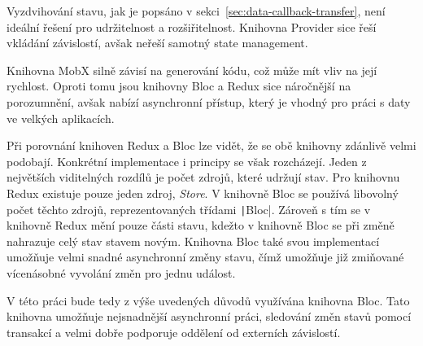 Vyzdvihování stavu,
jak je popsáno v sekci~\ref{sec:data-callback-transfer},
není ideální řešení pro udržitelnost a rozšiřitelnost.
Knihovna Provider sice řeší vkládání závislostí,
avšak neřeší samotný state management.

Knihovna MobX silně závisí na generování kódu,
což může mít vliv na její rychlost.
Oproti tomu jsou knihovny Bloc a Redux sice náročnější na porozumnění,
avšak nabízí asynchronní přístup,
který je vhodný pro práci s daty ve velkých aplikacích.

Při porovnání knihoven Redux a Bloc lze vidět,
že se obě knihovny zdánlivě velmi podobají.
Konkrétní implementace i principy se však rozcházejí.
Jeden z největších viditelných rozdílů je počet zdrojů,
které udržují stav.
Pro knihovnu Redux existuje pouze jeden zdroj, \emph{Store}.
V knihovně Bloc se používá libovolný počet těchto zdrojů,
reprezentovaných třídami \texttt|Bloc|.
Zároveň s tím se v knihovně Redux mění pouze části stavu,
kdežto v knihovně Bloc se při změně nahrazuje celý stav stavem novým.
Knihovna Bloc také svou implementací umožňuje velmi snadné asynchronní změny
stavu,
čímž umožňuje již zmiňované vícenásobné vyvolání změn pro jednu událost.

V této práci bude tedy z výše uvedených důvodů využívána knihovna Bloc.
Tato knihovna umožňuje nejsnadnější asynchronní práci,
sledování změn stavů pomocí transakcí
a velmi dobře podporuje oddělení od externích závislostí.
